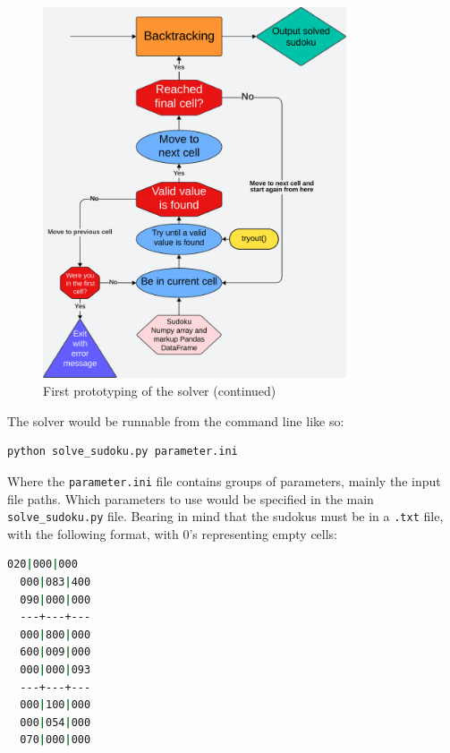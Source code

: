 \documentclass[12pt]{report} %
\begin{document}
\begin{figure}[bthp]
  \centering
  \includegraphics[width=0.8\textwidth]{prototyping1_next.png}
  \caption{First prototyping of the solver (continued)}
\end{figure}

\newpage
The solver would be runnable from the command line like so:

\begin{lstlisting}[language=bash]
  python solve_sudoku.py parameter.ini
\end{lstlisting}

Where the \texttt{parameter.ini} file contains groups of parameters, mainly the input file paths. Which parameters to use would be specified in the main \texttt{solve\_sudoku.py} file. Bearing in mind that the sudokus must be in a \texttt{.txt} file, with the following format, with 0's representing empty cells:

\vspace*{1\baselineskip}
\begin{lstlisting}[language=bash]
  020|000|000
  000|083|400
  090|000|000
  ---+---+---
  000|800|000
  600|009|000
  000|000|093
  ---+---+---
  000|100|000
  000|054|000
  070|000|000
\end{lstlisting}
\end{document}
